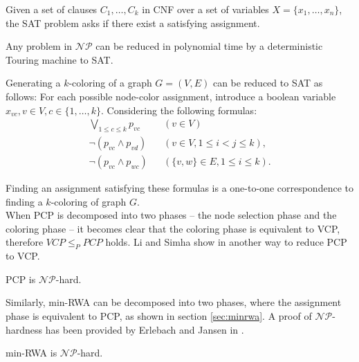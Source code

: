 \begin{definition}[SAT]
Given a set of clauses $C_1, \ldots , C_k$ in CNF over a set of variables $X = \{x_1,\ldots,x_n\}$, the SAT problem asks if there exist a satisfying assignment.
\end{definition}

\begin{theorem}
Any problem in $\mathcal{NP}$ can be reduced in polynomial time by a deterministic Touring machine to SAT.
\end{theorem}

Generating a $k$-coloring of a graph $G=(V,E)$ can be reduced to SAT as follows: For each possible node-color assignment, introduce a boolean variable $x_{vc}, v\in V, c\in \{1,\ldots ,k\}$. Considering the following formulas:
\begin{align}
\bigvee_{1\leq c \leq k}p_{vc} && (v\in V)\\
\neg (p_{vc} \wedge p_{vd}) 		&& (v\in V, 1 \leq i < j \leq k),\\
\neg (p_{vc} \wedge p_{wc})		&& (\{v,w\}\in E, 1 \leq i \leq k).
\end{align}

Finding an assignment satisfying these formulas is a one-to-one correspondence to finding a $k$-coloring of graph $G$.\\

When PCP is decomposed into two phases -- the node selection phase and the coloring phase -- it becomes clear that the coloring phase is equivalent to VCP, therefore $VCP \leq_P PCP$ holds. Li and Simha show in \cite{li-00} another way to reduce PCP to VCP.

\begin{theorem}
PCP is $\mathcal{NP}$-hard.
\end{theorem}

Similarly, min-RWA can be decomposed into two phases, where the assignment phase is equivalent to PCP, as shown in section \ref{sec:minrwa}. A proof of $\mathcal{NP}$-hardness has been provided by Erlebach and Jansen in \cite{erlebach-01}.

\begin{theorem}
min-RWA is $\mathcal{NP}$-hard.
\end{theorem}